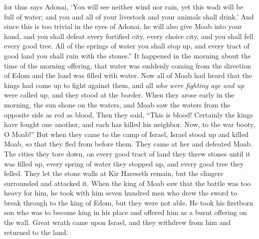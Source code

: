 \begin{biblechapter}
\verse for thus says Adonai, ‘You will see neither wind nor rain, yet this wadi will be full of water; and you and all of your livestock and your animals shall drink.’
\verse And since this is too trivial in the eyes of Adonai, he will also give Moab into your hand,
\verse and you shall defeat every fortified city, every choice city, and you shall fell every good tree. All of the springs of water you shall stop up, and every tract of good land you shall ruin with the stones.”
\verse It happened in the morning about the time of the morning offering, that water was suddenly coming from the direction of Edom and the land was filled with water.
\verse Now all of Moab had heard that the kings had come up to fight against them, and all \textit{who were fighting age and up} were called up, and they stood at the border.
\verse When they arose early in the morning, the sun shone on the waters, and Moab saw the waters from the opposite side as red as blood.
\verse Then they said, “This is blood! Certainly the kings have fought one another, and each has killed his neighbor. Now, to the war booty, O Moab!”
\verse But when they came to the camp of Israel, Israel stood up and killed Moab, so that they fled from before them. They came at her and defeated Moab.
\verse The cities they tore down, on every good tract of land they threw stones until it was filled up, every spring of water they stopped up, and every good tree they felled. They let the stone walls at Kir Hareseth remain, but the slingers surrounded and attacked it.
\verse When the king of Moab saw that the battle was too heavy for him, he took with him seven hundred men who drew the sword to break through to the king of Edom, but they were not able.
\verse He took his firstborn son who was to become king in his place and offered him as a burnt offering on the wall. Great wrath came upon Israel, and they withdrew from him and returned to the land.
\end{biblechapter}

